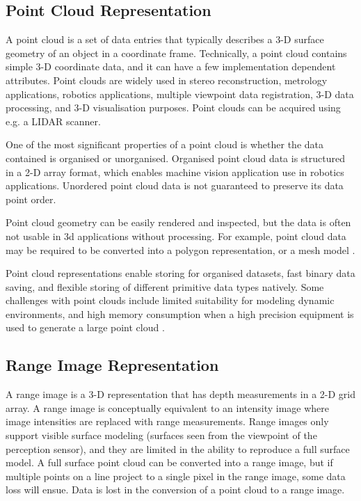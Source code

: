\documentclass[12pt,a4paper,oneside,pdftex]{report}
\begin{document}
\subsection{Point Cloud Representation}
\label{subsection:point_cloud_representation}

A point cloud is a set of data entries that typically describes a 3-D surface geometry of an object in a coordinate frame. Technically, a point cloud contains simple 3-D coordinate data, and it can have a few implementation dependent attributes. Point clouds are widely used in stereo reconstruction, metrology applications, robotics applications, multiple viewpoint data registration, 3-D data processing, and 3-D visualisation purposes. Point clouds can be acquired using e.g. a LIDAR scanner.

One of the most significant properties of a point cloud is whether the data contained is organised or unorganised. Organised point cloud data is structured in a 2-D array format, which enables machine vision application use in robotics applications. Unordered point cloud data is not guaranteed to preserve its data point order.

Point cloud geometry can be easily rendered and inspected, but the data is often not usable in 3d applications without processing. For example, point cloud data may be required to be converted into a polygon representation, or a mesh model \citep{Rusinkiewicz00}.

Point cloud representations enable storing for organised datasets, fast binary data saving, and flexible storing of different primitive data types natively\citep{PCDFormat14}. Some challenges with point clouds include limited suitability for modeling dynamic environments, and high memory consumption when a high precision equipment is used to generate a large point cloud \citep{Hornung10}.

\subsection{Range Image Representation}
\label{subsection:range_image_representation}

A range image is a 3-D representation that has depth measurements in a 2-D grid array. A range image is conceptually equivalent to an intensity image where image intensities are replaced with range measurements. Range images only support visible surface modeling (surfaces seen from the viewpoint of the perception sensor), and they are limited in the ability to reproduce a full surface model. A full surface point cloud can be converted into a range image, but if multiple points on a line project to a single pixel in the range image, some data loss will ensue. Data is lost in the conversion of a point cloud to a range image.
\end{document}
